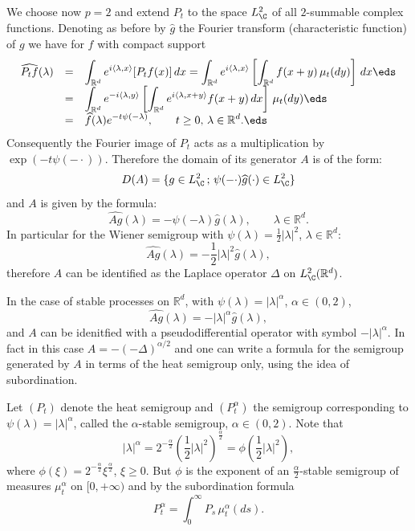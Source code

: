 \documentclass[preprint]{imsart}
\def\R{\mathbb R}
\def\ds{\displaystyle}
\begin{document}
{We choose now $p=2$ and extend $P_t$ to the space
$L^2_\C$ of all $2$-summable complex functions.
Denoting as before by $\widehat{g}$ the Fourier
transform (characteristic function)
of $g$ we have for $f$ with compact support
$$
  \begin{array}{lll}
    \widehat{P_tf}(\lambda)&= & \ds
\int_{\R^d}e^{i\langle \lambda ,x\rangle}
[P_tf(x)]\, dx =
\int_{\R^d}e^{i\langle \lambda ,x\rangle}
\left[\int_{\R^d} f(x+y)\, \mu_t(dy)\right]\, dx
    \eds \\
    &= & \ds
\int_{\R^d}e^{-i\langle \lambda ,y\rangle}
\left[\int_{\R^d}
e^{i\langle \lambda ,x+y\rangle} f(x+y)\, dx
\right]\, \mu_t(dy)
\eds \\
&=&\ds
\widehat{f}(\lambda)e^{-t\psi(-\lambda)},
\qquad t\geq 0,\, \lambda\in\R^d.
\eds
  \end{array}
$$
Consequently the Fourier image of $P_t$ acts as a
multiplication by $\exp (-t\psi(-\cdot))$. Therefore
the domain of its generator $A$ is of the form:
$$
D(A)=\{g\in L^2_\C \, ;\,
\psi (-\cdot)\widehat{g}(\cdot)\in L^2_\C\}
$$
and $A$ is given by the formula:
$$
\widehat{Ag}(\lambda)=-\psi(-\lambda)
\widehat{g}(\lambda),
\qquad \lambda\in\R^d.
$$
In particular for the Wiener semigroup with
$\psi(\lambda)=\frac{1}{2}|\lambda|^2$,
$\lambda\in\R^d$:
$$
\widehat{Ag}(\lambda)=-\frac{1}{2}|\lambda|^2
\widehat{g}(\lambda),
$$
therefore $A$ can be identified as the Laplace operator
$\Delta$ on $L^2_\C(\R^d)$.

In the case of stable processes on $\R^d$, with
$\psi(\lambda)=|\lambda|^\alpha$, $\alpha\in (0,2)$,
$$
\widehat{Ag}(\lambda)=-|\lambda|^\alpha
\widehat{g}(\lambda),
$$
and $A$ can be idenitfied with a pseudodifferential
operator with symbol $-|\lambda|^\alpha$. In fact in
this case $A=-(-\Delta)^{\alpha /2}$ and one can write
a formula for the semigroup generated by $A$ in terms
of the heat semigroup only, using the idea of
subordination.

Let $(P_t)$ denote the heat semigroup and
$(P_t^\alpha)$ the semigroup corresponding to
$\psi(\lambda)=|\lambda|^\alpha$, called the
$\alpha$-stable semigroup, $\alpha\in (0,2)$. Note that
$$
|\lambda|^\alpha=2^{-\frac{\alpha}{2}}
\left( \frac{1}{2}|\lambda|^2\right)^{\frac{\alpha}{2}}
= \phi \left( \frac{1}{2}|\lambda|^2\right),
$$
where $\phi(\xi) =2^{-\frac{\alpha}{2}}
\xi^{\frac{\alpha}{2}}$, $\xi\geq 0$. But $\phi $ is the
exponent of an $\frac{\alpha}{2}$-stable semigroup of
measures $\mu_t^\alpha$ on $[0,+\infty)$ and by the
subordination formula
$$
P_t^\alpha = \int_0^\infty P_s\, \mu_t^\alpha(ds).
$$




}
\end{document}
